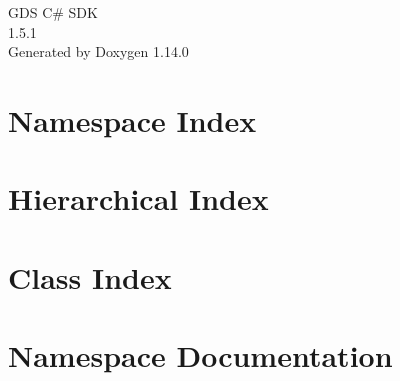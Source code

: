 \documentclass[twoside]{book}
\newcommand{\+}{\discretionary{\mbox{\scriptsize$\hookleftarrow$}}{}{}}
\newcommand{\clearemptydoublepage}{%
    \newpage{\pagestyle{empty}\cleardoublepage}%
  }
\begin{document}
  \raggedbottom
    \hypersetup{pageanchor=false,
                bookmarksnumbered=true,
                pdfencoding=unicode
               }
  \begin{titlepage}
  \vspace*{7cm}
  \begin{center}%
  {\Large GDS C\# SDK}\\
  [1ex]\large 1.\+5.\+1 \\
  \vspace*{1cm}
  {\large Generated by Doxygen 1.14.0}\\
  \end{center}
  \end{titlepage}
  \clearemptydoublepage
  \tableofcontents
  \clearemptydoublepage
  \hypersetup{pageanchor=true}
\chapter{Namespace Index}

\chapter{Hierarchical Index}

\chapter{Class Index}

\chapter{Namespace Documentation}








\end{document}

